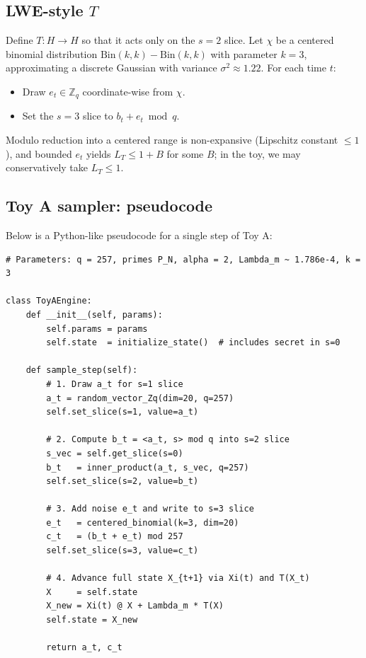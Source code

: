 \documentclass[11pt]{article}
\begin{document}
\subsection{LWE-style $T$}

Define $T: H \to H$ so that it acts only on the $s=2$ slice. Let $\chi$ be a
centered binomial distribution $\mathrm{Bin}(k,k) - \mathrm{Bin}(k,k)$ with
parameter $k=3$, approximating a discrete Gaussian with variance
$\sigma^2 \approx 1.22$.\cite{pqc-lwe} For each time $t$:

\begin{itemize}
    \item Draw $e_t \in \mathbb{Z}_q$ coordinate-wise from $\chi$.
    \item Set the $s=3$ slice to $b_t + e_t \bmod q$.
\end{itemize}

Modulo reduction into a centered range is non-expansive (Lipschitz constant
$\le 1$), and bounded $e_t$ yields $L_T \le 1 + B$ for some $B$; in the toy,
we may conservatively take $L_T \le 1$.

\subsection{Toy A sampler: pseudocode}

Below is a Python-like pseudocode for a single step of Toy A:

\begin{verbatim}
# Parameters: q = 257, primes P_N, alpha = 2, Lambda_m ~ 1.786e-4, k = 3

class ToyAEngine:
    def __init__(self, params):
        self.params = params
        self.state  = initialize_state()  # includes secret in s=0

    def sample_step(self):
        # 1. Draw a_t for s=1 slice
        a_t = random_vector_Zq(dim=20, q=257)
        self.set_slice(s=1, value=a_t)

        # 2. Compute b_t = <a_t, s> mod q into s=2 slice
        s_vec = self.get_slice(s=0)
        b_t   = inner_product(a_t, s_vec, q=257)
        self.set_slice(s=2, value=b_t)

        # 3. Add noise e_t and write to s=3 slice
        e_t   = centered_binomial(k=3, dim=20)
        c_t   = (b_t + e_t) mod 257
        self.set_slice(s=3, value=c_t)

        # 4. Advance full state X_{t+1} via Xi(t) and T(X_t)
        X     = self.state
        X_new = Xi(t) @ X + Lambda_m * T(X)
        self.state = X_new

        return a_t, c_t
\end{verbatim}
\end{document}
